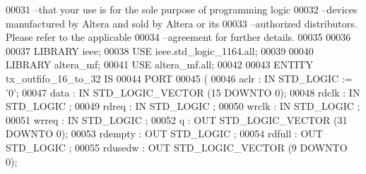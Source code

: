 \begin{DoxyCode}
{00031 \textcolor{keyword}{--that your use is for the sole purpose of programming logic }
00032 \textcolor{keyword}{--devices manufactured by Altera and sold by Altera or its }
00033 \textcolor{keyword}{--authorized distributors.  Please refer to the applicable }
00034 \textcolor{keyword}{--agreement for further details.}
00035 
00036 
00037 \textcolor{vhdlkeyword}{LIBRARY }\textcolor{keywordflow}{ieee};
00038 \textcolor{vhdlkeyword}{USE }ieee.std\_logic\_1164.\textcolor{keywordflow}{all};
00039 
00040 \textcolor{vhdlkeyword}{LIBRARY }\textcolor{keywordflow}{altera\_mf};
00041 \textcolor{vhdlkeyword}{USE }\textcolor{keywordflow}{altera\_mf.all};
00042 
00043 \textcolor{keywordflow}{ENTITY }tx_outfifo_16_to_32 \textcolor{keywordflow}{IS}
00044     \textcolor{keywordflow}{PORT}
00045     \textcolor{vhdlchar}{(}
00046         \textcolor{vhdlchar}{aclr}        \textcolor{vhdlchar}{:} \textcolor{keywordflow}{IN} \textcolor{comment}{STD\_LOGIC}  \textcolor{vhdlchar}{:=} \textcolor{vhdlchar}{'}\textcolor{vhdllogic}{}\textcolor{vhdllogic}{0}\textcolor{vhdlchar}{'};
00047         \textcolor{vhdlchar}{data}        \textcolor{vhdlchar}{:} \textcolor{keywordflow}{IN} \textcolor{comment}{STD\_LOGIC\_VECTOR} \textcolor{vhdlchar}{(}\textcolor{vhdllogic}{}\textcolor{vhdllogic}{15} \textcolor{keywordflow}{DOWNTO} \textcolor{vhdllogic}{}\textcolor{vhdllogic}{0}\textcolor{vhdlchar}{)};
00048         \textcolor{vhdlchar}{rdclk}       \textcolor{vhdlchar}{:} \textcolor{keywordflow}{IN} \textcolor{comment}{STD\_LOGIC} ;
00049         \textcolor{vhdlchar}{rdreq}       \textcolor{vhdlchar}{:} \textcolor{keywordflow}{IN} \textcolor{comment}{STD\_LOGIC} ;
00050         \textcolor{vhdlchar}{wrclk}       \textcolor{vhdlchar}{:} \textcolor{keywordflow}{IN} \textcolor{comment}{STD\_LOGIC} ;
00051         \textcolor{vhdlchar}{wrreq}       \textcolor{vhdlchar}{:} \textcolor{keywordflow}{IN} \textcolor{comment}{STD\_LOGIC} ;
00052         \textcolor{vhdlchar}{q}       \textcolor{vhdlchar}{:} \textcolor{keywordflow}{OUT} \textcolor{comment}{STD\_LOGIC\_VECTOR} \textcolor{vhdlchar}{(}\textcolor{vhdllogic}{}\textcolor{vhdllogic}{31} \textcolor{keywordflow}{DOWNTO} \textcolor{vhdllogic}{}\textcolor{vhdllogic}{0}\textcolor{vhdlchar}{)};
00053         \textcolor{vhdlchar}{rdempty}     \textcolor{vhdlchar}{:} \textcolor{keywordflow}{OUT} \textcolor{comment}{STD\_LOGIC} ;
00054         \textcolor{vhdlchar}{rdfull}      \textcolor{vhdlchar}{:} \textcolor{keywordflow}{OUT} \textcolor{comment}{STD\_LOGIC} ;
00055         \textcolor{vhdlchar}{rdusedw}     \textcolor{vhdlchar}{:} \textcolor{keywordflow}{OUT} \textcolor{comment}{STD\_LOGIC\_VECTOR} \textcolor{vhdlchar}{(}\textcolor{vhdllogic}{}\textcolor{vhdllogic}{9} \textcolor{keywordflow}{DOWNTO} \textcolor{vhdllogic}{}\textcolor{vhdllogic}{0}\textcolor{vhdlchar}{)};
}
\end{DoxyCode}
